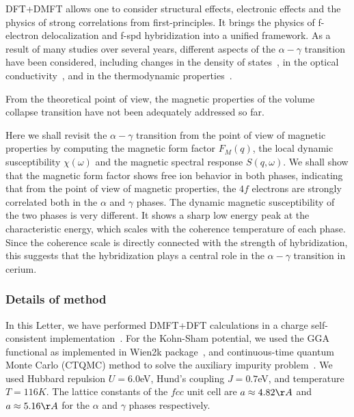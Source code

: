 \documentclass[10pt]{ruthesis}
\begin{document}
{DFT+DMFT allows one to
consider  structural effects, electronic effects and the physics of strong
correlations from first-principles. It brings the physics of
f-electron delocalization and f-spd hybridization into a unified
framework.
%
As a result of many studies over several years, different
aspects of the $\alpha-\gamma$ transition have been considered,
including changes in the density of states~\cite{zolf2001, held2001,
  mcmahan2003}, in the optical conductivity~\cite{hauleCe}, and in the
thermodynamic properties~\cite{amadon}. 

From the theoretical point of view, the magnetic properties of the
volume collapse transition have not been adequately addressed so far.

Here we shall revisit the $\alpha-\gamma$ transition from the point of
view of magnetic properties by computing the magnetic form factor
$F_{M}(q)$, the local dynamic susceptibility $\chi(\omega)$ and the
magnetic spectral response $S(q,\omega)$. We shall show that the
magnetic form factor shows free ion behavior in both phases,
indicating that from the point of view of magnetic properties, the
$4f$ electrons are strongly correlated both in the $\alpha$ and
$\gamma$ phases.  The dynamic magnetic susceptibility of the two
phases is very different. It shows a sharp low energy peak at the
characteristic energy, which scales with the coherence temperature of each
phase. Since the coherence scale is directly connected with the
strength of hybridization, this suggests that the hybridization plays
a central role in the $\alpha-\gamma$ transition in cerium.

\subsubsection{Details of method}

 In this Letter, we have performed DMFT+DFT calculations in a charge self-consistent
implementation~\cite{hauleLDADMFT}. For the Kohn-Sham potential, we used the GGA functional
as implemented in Wien2k package~\cite{wien2k}, and continuous-time
quantum Monte Carlo (CTQMC) method to solve the auxiliary impurity
problem~\cite{hauleCTQMC}.  We used Hubbard repulsion $U=6.0$eV,
Hund's coupling $J=0.7$eV, and temperature $T=116K$.  The lattice
constants of the $fcc$ unit cell are $a \approx 4.82\AA$ and $a\approx
5.16\AA$ for the $\alpha$ and $\gamma$ phases respectively.


}
\end{document}
